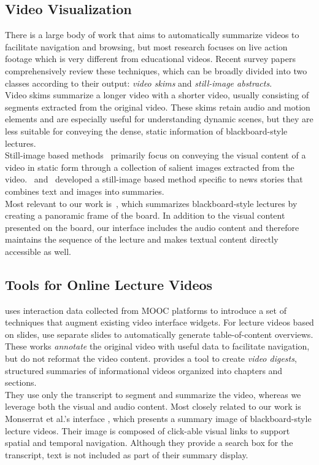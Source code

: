 \subsection{Video Visualization}
There is a large body of work that aims to automatically summarize videos to facilitate navigation and browsing, but most research focuses on live action footage which is very different from educational videos.  Recent survey papers \cite{truong2007video,borgo2011survey} comprehensively review these techniques, which can be broadly divided into two classes according to their output: \textit{video skims} and \textit{still-image abstracts}. \\
%
Video skims \cite{he1999auto,ekin2003automatic,ngo2005video,lu2013story} summarize a longer video with a shorter video, usually consisting of segments extracted from the original video. These skims retain audio and motion elements and are especially useful for understanding dynamic scenes, but they are less suitable for conveying the dense, static information of blackboard-style lectures. \\
%
Still-image based methods~\cite{uchihashi1999video,barnes2010video,hwang2006cinema,boreczky2000interactive}
primarily focus on conveying the visual content of a
video in static form through a collection of salient images extracted from the video.~\cite{christel2002collages} and~\cite{pickering2003anses} developed a still-image based method specific to news stories that combines text and images into summaries.\\
%
Most relevant to our work is~\cite{choudary2007summarization}, which summarizes blackboard-style lectures by creating a panoramic frame of the board. In addition to the visual content presented on the board, our interface includes the audio content and therefore maintains the sequence of the lecture and makes textual content directly accessible as well.\\

\subsection{Tools for Online Lecture Videos}
\cite{kim2014data} uses interaction data collected from MOOC platforms to introduce a set of techniques that augment existing video interface widgets. For lecture videos based on slides, \cite{li2000browsing} use separate slides to automatically generate table-of-content overviews. These works \textit{annotate} the original video with useful data to facilitate navigation, but do not reformat the video content. \cite{pavel2014video} provides a tool to create \textit{video digests}, structured summaries of informational videos organized into chapters and sections.\\
%
They use  only the transcript to segment and summarize the video, whereas we leverage both the visual and audio content. Most closely related to our work is Monserrat et al.'s interface \cite{monserrat2013notevideo}, which presents a summary image of blackboard-style lecture videos. Their image is composed of click-able visual links to support spatial and temporal navigation. Although they provide a search box for the transcript, text is not included as part of their summary display.

